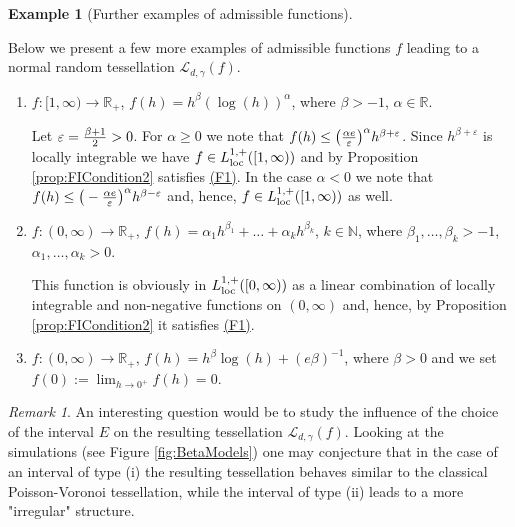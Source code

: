 \documentclass[11pt,a4paper]{article}
\theoremstyle{plain}
\theoremstyle{definition}
\newtheorem{example}[theorem]{Example}
\theoremstyle{remark}
\newtheorem{remark}[theorem]{Remark}
\def\NN{\mathbb{N}}
\def\RR{\mathbb{R}}
\def\cL{\mathcal{L}}
\begin{document}
\begin{example}[Further examples of admissible functions]\label{ex:FirstExample}

Below we present a few more examples of admissible functions $f$ leading to a normal random tessellation $\cL_{d,\gamma}(f)$.

\begin{enumerate}
    \item $f\colon [1,\infty)\to \RR_+$, $f(h)=h^\beta (\log(h))^{\alpha}$, where $\beta>-1$, $\alpha\in \RR$.

    \medskip

    Let $\varepsilon ={\beta+1\over 2}>0$. For $\alpha\ge 0$ we note that $f(h)\leq \big({\alpha e\over \varepsilon}\big)^{\alpha}h^{\beta+\varepsilon}$. Since  $h^{\beta+\varepsilon}$ is locally integrable we have $f\in L^{1,+}_{\rm loc}([1,\infty))$ and by Proposition \ref{prop:FICondition2} satisfies \hyperref[item:F1]{(F1)}. In the case $\alpha<0$ we note that $f(h)\leq \big(-{\alpha e\over \varepsilon}\big)^{\alpha}h^{\beta-\varepsilon}$ and, hence, $f\in L^{1,+}_{\rm loc}([1,\infty))$ as well.
    
    \item $f\colon (0,\infty)\to \RR_+$, $f(h)=\alpha_1h^{\beta_1}+\ldots +\alpha_k h^{\beta_k}$, $k\in\NN$, where $\beta_1, \ldots, \beta_k >-1$, $\alpha_1,\ldots,\alpha_k>0$.

    \medskip

    This function is obviously in $L^{1,+}_{\rm loc}([0,\infty))$ as a linear combination of locally integrable and non-negative functions on $(0,\infty)$ and, hence, by Proposition \ref{prop:FICondition2} it satisfies \hyperref[item:F1]{(F1)}.
    
    \item $f\colon (0,\infty)\to \RR_+$, $f(h)=h^\beta \log(h)+(e\beta)^{-1}$, where $\beta>0$ and we set $f(0):=\lim_{h\to 0^+}f(h)=0$. 
\end{enumerate}
\end{example}

\begin{remark}
    An interesting question would be to study the influence of the choice of the interval $E$ on the resulting tessellation $\cL_{d,\gamma}(f)$. Looking at the simulations (see Figure \ref{fig:BetaModels}) one may conjecture that in the case of an interval of type (i) the resulting tessellation behaves similar to the classical Poisson-Voronoi tessellation, while the interval of type (ii) leads to a more "irregular" structure.
\end{remark}
\end{document}

